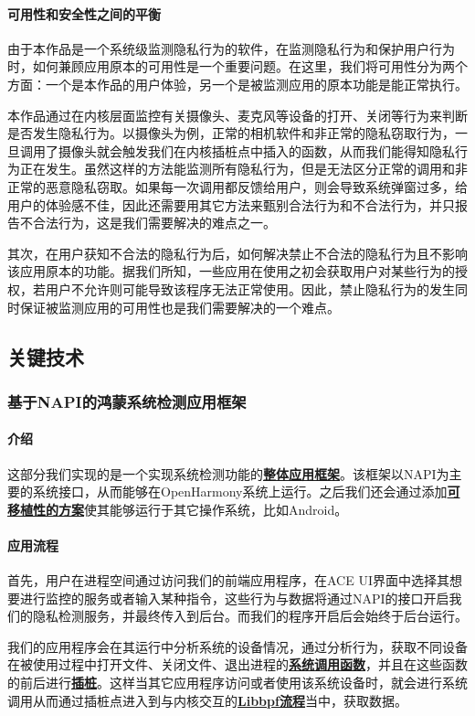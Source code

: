 \documentclass[12pt,a4paper]{ctexart}
\newcommand{\important}[1]{\uline{\textbf{#1}}}
\begin{document}
\paragraph{可用性和安全性之间的平衡}
由于本作品是一个系统级监测隐私行为的软件，在监测隐私行为和保护用户行为时，如何兼顾应用原本的可用性是一个重要问题。在这里，我们将可用性分为两个方面：一个是本作品的用户体验，另一个是被监测应用的原本功能是能正常执行。


本作品通过在内核层面监控有关摄像头、麦克风等设备的打开、关闭等行为来判断是否发生隐私行为。以摄像头为例，正常的相机软件和非正常的隐私窃取行为，一旦调用了摄像头就会触发我们在内核插桩点中插入的函数，从而我们能得知隐私行为正在发生。虽然这样的方法能监测所有隐私行为，但是无法区分正常的调用和非正常的恶意隐私窃取。如果每一次调用都反馈给用户，则会导致系统弹窗过多，给用户的体验感不佳，因此还需要用其它方法来甄别合法行为和不合法行为，并只报告不合法行为，这是我们需要解决的难点之一。


其次，在用户获知不合法的隐私行为后，如何解决禁止不合法的隐私行为且不影响该应用原本的功能。据我们所知，一些应用在使用之初会获取用户对某些行为的授权，若用户不允许则可能导致该程序无法正常使用。因此，禁止隐私行为的发生同时保证被监测应用的可用性也是我们需要解决的一个难点。

\subsection{关键技术}
\subsubsection{基于NAPI的鸿蒙系统检测应用框架}
\paragraph{介绍}
这部分我们实现的是一个实现系统检测功能的\important{整体应用框架}。该框架以NAPI为主要的系统接口，从而能够在OpenHarmony系统上运行。之后我们还会通过添加\important{可移植性的方案}使其能够运行于其它操作系统，比如Android。

\paragraph{应用流程}
首先，用户在进程空间通过访问我们的前端应用程序，在ACE UI界面中选择其想要进行监控的服务或者输入某种指令，这些行为与数据将通过NAPI的接口开启我们的隐私检测服务，并最终传入到后台。而我们的程序开启后会始终于后台运行。


我们的应用程序会在其运行中分析系统的设备情况，通过分析行为，获取不同设备在被使用过程中打开文件、关闭文件、退出进程的\important{系统调用函数}，并且在这些函数的前后进行\important{插桩}。这样当其它应用程序访问或者使用该系统设备时，就会进行系统调用从而通过插桩点进入到与内核交互的\important{Libbpf流程}当中，获取数据。
\end{document}
